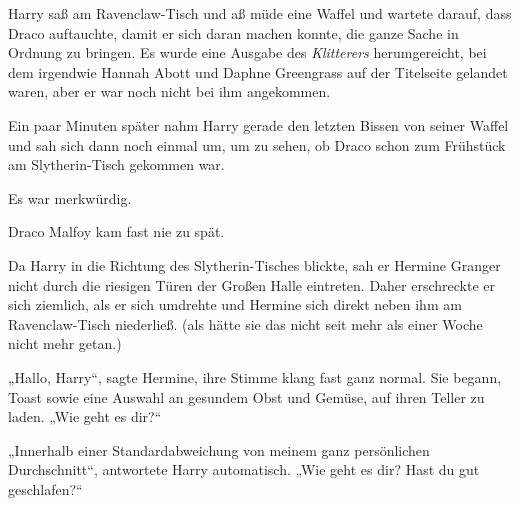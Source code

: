 Harry saß am Ravenclaw-Tisch und aß müde eine Waffel und wartete darauf, dass Draco auftauchte, damit er sich daran machen konnte, die ganze Sache in Ordnung zu bringen. Es wurde eine Ausgabe des \emph{Klitterers} herumgereicht, bei dem irgendwie Hannah Abott und Daphne Greengrass auf der Titelseite gelandet waren, aber er war noch nicht bei ihm angekommen.

Ein paar Minuten später nahm Harry gerade den letzten Bissen von seiner Waffel und sah sich dann noch einmal um, um zu sehen, ob Draco schon zum Frühstück am Slytherin-Tisch gekommen war.

Es war merkwürdig.

Draco Malfoy kam fast nie zu spät.

Da Harry in die Richtung des Slytherin-Tisches blickte, sah er Hermine Granger nicht durch die riesigen Türen der Großen Halle eintreten. Daher erschreckte er sich ziemlich, als er sich umdrehte und Hermine sich direkt neben ihm am Ravenclaw-Tisch niederließ. (als hätte sie das nicht seit mehr als einer Woche nicht mehr getan.)

„Hallo, Harry“, sagte Hermine, ihre Stimme klang fast ganz normal. Sie begann, Toast sowie eine Auswahl an gesundem Obst und Gemüse, auf ihren Teller zu laden. „Wie geht es dir?“

„Innerhalb einer Standardabweichung von meinem ganz persönlichen Durchschnitt“, antwortete Harry automatisch. „Wie geht es dir? Hast du gut geschlafen?“


